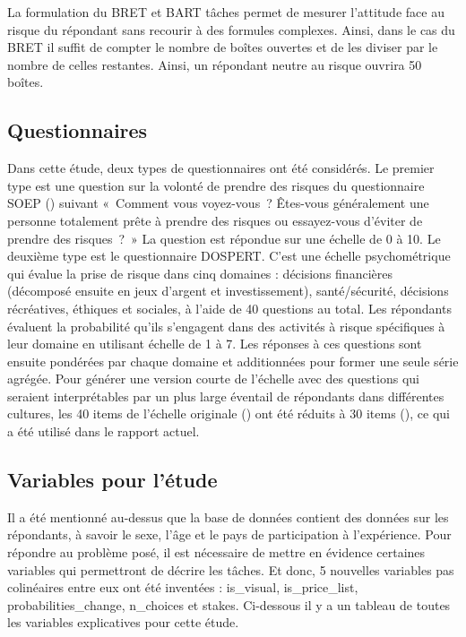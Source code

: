 \documentclass[12pt]{article}
\begin{document}
La formulation du BRET et BART tâches permet de mesurer l'attitude face
au risque du répondant sans recourir à des formules complexes. Ainsi,
dans le cas du BRET il suffit de compter le nombre de boîtes ouvertes et
de les diviser par le nombre de celles restantes. Ainsi, un répondant
neutre au risque ouvrira 50 boîtes.

\subsection{Questionnaires}

Dans cette étude, deux types de questionnaires ont été considérés. Le
premier type est une question sur la volonté de prendre des risques du
questionnaire SOEP (\citet{SOEP2007}) suivant «~Comment vous
voyez-vous~? Êtes-vous généralement une personne totalement prête à
prendre des risques ou essayez-vous d'éviter de prendre des risques~?~»
La question est répondue sur une échelle de 0 à 10. Le deuxième type est
le questionnaire DOSPERT. C'est une échelle psychométrique qui évalue la
prise de risque dans cinq domaines : décisions financières (décomposé
ensuite en jeux d'argent et investissement), santé/sécurité, décisions
récréatives, éthiques et sociales, à l'aide de 40 questions au total.
Les répondants évaluent la probabilité qu'ils s'engagent dans des
activités à risque spécifiques à leur domaine en utilisant échelle de 1
à 7. Les réponses à ces questions sont ensuite pondérées par chaque
domaine et additionnées pour former une seule série agrégée. Pour
générer une version courte de l'échelle avec des questions qui seraient
interprétables par un plus large éventail de répondants dans différentes
cultures, les 40 items de l'échelle originale (\citet{Weber2002}) ont
été réduits à 30 items (\citet{Blais2006}), ce qui a été utilisé dans le
rapport actuel.

\subsection{Variables pour l'étude}

Il a été mentionné au-dessus que la base de données contient des données
sur les répondants, à savoir le sexe, l'âge et le pays de participation
à l'expérience. Pour répondre au problème posé, il est nécessaire de
mettre en évidence certaines variables qui permettront de décrire les
tâches. Et donc, 5 nouvelles variables pas colinéaires entre eux ont été
inventées : is\_visual, is\_price\_list, probabilities\_change,
n\_choices et stakes. Ci-dessous il y a un tableau de toutes les
variables explicatives pour cette étude.
\end{document}
